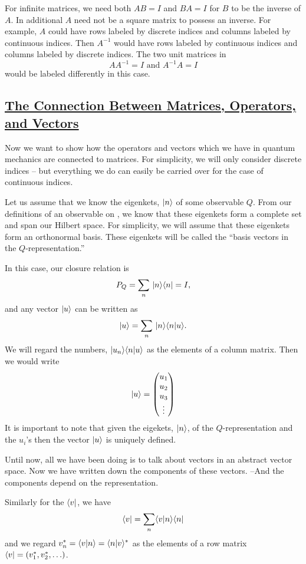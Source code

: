 For infinite matrices, we need both $AB = I$ and $BA = I$ for $B$ to be the inverse of $A$. In additional $A$ need not be a square matrix to possess an inverse. For example, $A$ could have rows labeled by discrete indices and 
columns labeled by continuous indices. Then $A^{-1}$ would have rows labeled by continuous indices and columns labeled by discrete indices. The two unit matrices in 
$$AA^{-1} = I \mbox{ and } A^{-1} A = I$$ would be labeled differently in this case.

\subsection{\underline{The Connection Between Matrices, Operators, and Vectors}}
Now we want to show how the operators and vectors which we have in quantum mechanics are connected to matrices. For simplicity, we will only consider discrete indices -- but everything we do can easily be carried over for the 
case of continuous indices.

Let us assume that we know the eigenkets, $|n\rangle$ of some observable $Q$. From our definitions of an observable on , we know that these eigenkets form a complete set and span our Hilbert space. For simplicity, 
we will assume that these eigenkets form an orthonormal basis. These eigenkets will be called the ``basis vectors in the $Q$-representation.''

In this case, our closure relation is
$$P_Q = \sum_n\, |n\rangle \langle n| = I,$$ and any vector $|u\rangle$ can be written as $$|u\rangle = \sum_n\, |n\rangle\langle n|u\rangle.$$ We will regard the numbers, $|u_n\rangle \langle n|u\rangle$ as the elements of a column matrix.
Then we would write 
$$|u\rangle = 
\begin{pmatrix}
u_1\\ u_2\\ u_3\\ \vdots
\end{pmatrix}$$
It is important to note that given the eigekets, $|n\rangle$, of the $Q$-representation and the $u_i$'s then the vector $|u\rangle$ is uniquely defined. 

Until now, all we have been doing is to talk about vectors in an abstract vector space. Now we have written down the components of these vectors. --And the components depend on the representation.

Similarly for the $\langle v|$, we have $$\langle v| = \sum_n \langle v|n\rangle\langle n|$$ and we regard 
$v_n^* = \langle v|n\rangle = \langle n|v\rangle^*$ as the elements of a row matrix $\langle v| = (v_1^*, v_2^*, \hdots)$. 

